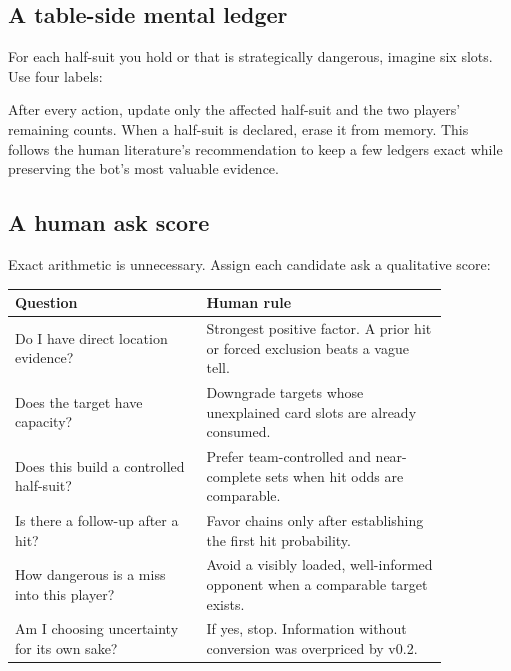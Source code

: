 \documentclass[11pt]{article}
\begin{document}
\subsection{A table-side mental ledger}

For each half-suit you hold or that is strategically dangerous, imagine six slots. Use four labels:

\begin{center}
\end{center}

After every action, update only the affected half-suit and the two players' remaining counts. When a half-suit is declared, erase it from memory. This follows the human literature's recommendation to keep a few ledgers exact while preserving the bot's most valuable evidence.

\subsection{A human ask score}

Exact arithmetic is unnecessary. Assign each candidate ask a qualitative score:

\begin{center}
\begin{tabular}{>{\raggedright\arraybackslash}p{0.38\linewidth}>{\raggedright\arraybackslash}p{0.48\linewidth}}
\toprule
Question & Human rule \\
\midrule
Do I have direct location evidence? & Strongest positive factor. A prior hit or forced exclusion beats a vague tell. \\
Does the target have capacity? & Downgrade targets whose unexplained card slots are already consumed. \\
Does this build a controlled half-suit? & Prefer team-controlled and near-complete sets when hit odds are comparable. \\
Is there a follow-up after a hit? & Favor chains only after establishing the first hit probability. \\
How dangerous is a miss into this player? & Avoid a visibly loaded, well-informed opponent when a comparable target exists. \\
Am I choosing uncertainty for its own sake? & If yes, stop. Information without conversion was overpriced by v0.2. \\
\bottomrule
\end{tabular}
\end{center}
\end{document}
